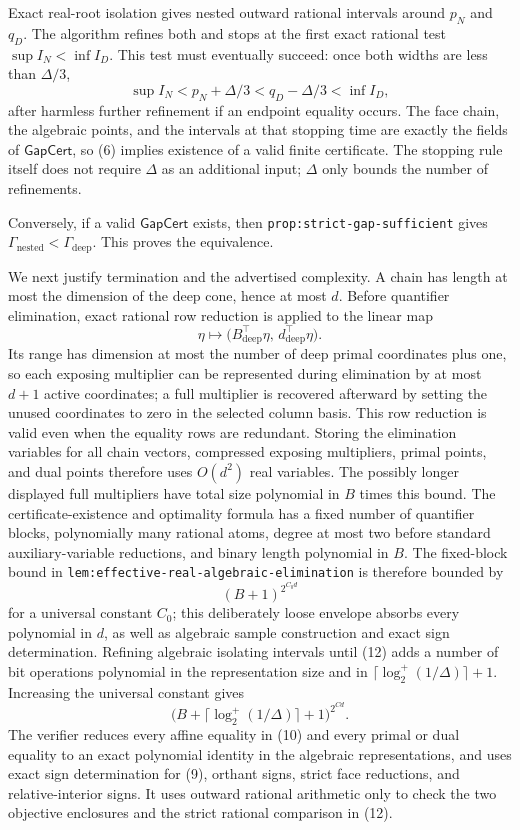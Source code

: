 Exact real-root isolation gives nested outward rational intervals around
\(p_N\) and \(q_D\).  The algorithm refines both and stops at the first exact
rational test \(\sup I_N<\inf I_D\).  This test must eventually succeed:
once both widths are less than \(\Delta/3\),
\[
 \sup I_N
 <p_N+\Delta/3
 <q_D-\Delta/3
 <\inf I_D, \tag{12}
\]
after harmless further refinement if an endpoint equality occurs.  The face
chain, the algebraic points, and the intervals at that stopping time are
exactly the fields of \(\mathsf{GapCert}\), so (6) implies existence of a valid
finite certificate.  The stopping rule itself does not require \(\Delta\) as
an additional input; \(\Delta\) only bounds the number of refinements.

Conversely, if a valid \(\mathsf{GapCert}\) exists, then
\texttt{prop:strict-gap-sufficient} gives
\(\Gamma_{\mathrm{nested}}<\Gamma_{\mathrm{deep}}\).  This proves the
equivalence.

We next justify termination and the advertised complexity.  A chain has length
at most the dimension of the deep cone, hence at most \(d\).  Before
quantifier elimination, exact rational row reduction is applied to the linear
map
\[
 \eta\longmapsto
 \bigl(B_{\mathrm{deep}}^{\top}\eta,\,
       d_{\mathrm{deep}}^{\top}\eta\bigr).
\]
Its range has dimension at most the number of deep primal coordinates plus
one, so each exposing multiplier can be represented during elimination by at
most \(d+1\) active coordinates; a full multiplier is recovered afterward by
setting the unused coordinates to zero in the selected column basis.  This
row reduction is valid even when the equality rows are redundant.  Storing the
elimination variables for all chain vectors, compressed exposing multipliers,
primal points, and dual points therefore uses \(O(d^2)\) real variables.  The
possibly longer displayed full multipliers have total size polynomial in
\(B\) times this bound.  The certificate-existence and optimality formula
has a fixed number of quantifier blocks, polynomially many rational atoms,
degree at most two before standard auxiliary-variable reductions, and binary
length polynomial in \(B\).  The fixed-block bound in
\texttt{lem:effective-real-algebraic-elimination} is therefore bounded by
\[
 (B+1)^{2^{C_0d}} \tag{13}
\]
for a universal constant \(C_0\); this deliberately loose envelope absorbs
every polynomial in \(d\), as well as algebraic sample construction and exact
sign determination.  Refining algebraic isolating intervals until (12) adds a
number of bit operations polynomial in the representation size and in
\(\lceil\log_2^+(1/\Delta)\rceil+1\).  Increasing the universal constant gives
\[
 \bigl(B+\lceil\log_2^+(1/\Delta)\rceil+1\bigr)^{2^{Cd}}. \tag{14}
\]
The verifier reduces every affine equality in (10) and every primal or dual
equality to an exact polynomial identity in the algebraic representations, and
uses exact sign determination for (9), orthant signs, strict face reductions,
and relative-interior signs.  It uses outward rational arithmetic only to
check the two objective enclosures and the strict rational comparison in
(12).

